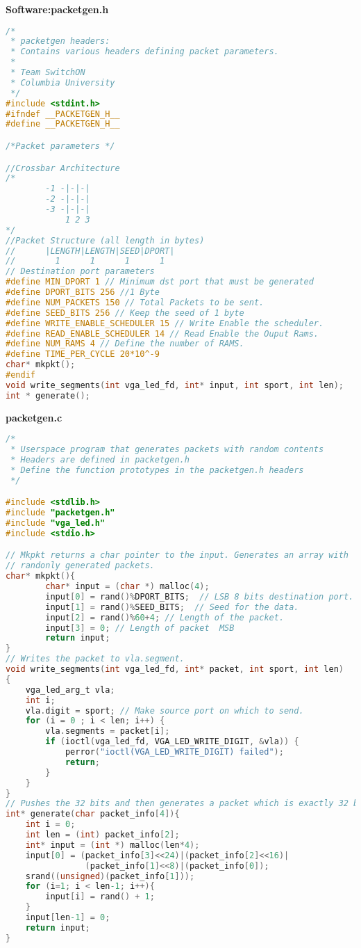 \documentclass[twoside,12pt,fleqn]{book} %
\begin{document}
\textbf{Software:packetgen.h}
\begin{lstlisting}[language=C]
/*
 * packetgen headers: 
 * Contains various headers defining packet parameters.  
 * 
 * Team SwitchON
 * Columbia University
 */
#include <stdint.h>
#ifndef __PACKETGEN_H__
#define __PACKETGEN_H__

/*Packet parameters */

//Crossbar Architecture
/*
        -1 -|-|-|
        -2 -|-|-|
        -3 -|-|-|
            1 2 3
*/
//Packet Structure (all length in bytes)
//      |LENGTH|LENGTH|SEED|DPORT|
//        1      1      1      1
// Destination port parameters
#define MIN_DPORT 1 // Minimum dst port that must be generated
#define DPORT_BITS 256 //1 Byte
#define NUM_PACKETS 150 // Total Packets to be sent.
#define SEED_BITS 256 // Keep the seed of 1 byte
#define WRITE_ENABLE_SCHEDULER 15 // Write Enable the scheduler.
#define READ_ENABLE_SCHEDULER 14 // Read Enable the Ouput Rams. 
#define NUM_RAMS 4 // Define the number of RAMS.
#define TIME_PER_CYCLE 20*10^-9
char* mkpkt();
#endif
void write_segments(int vga_led_fd, int* input, int sport, int len);
int * generate();
\end{lstlisting}
\newpage
\textbf{packetgen.c}
\begin{lstlisting}[language=C]
/*
 * Userspace program that generates packets with random contents 
 * Headers are defined in packetgen.h 
 * Define the function prototypes in the packetgen.h headers
 */

#include <stdlib.h>
#include "packetgen.h"
#include "vga_led.h"
#include <stdio.h>

// Mkpkt returns a char pointer to the input. Generates an array with 
// randonly generated packets.
char* mkpkt(){
        char* input = (char *) malloc(4);
        input[0] = rand()%DPORT_BITS;  // LSB 8 bits destination port.
        input[1] = rand()%SEED_BITS;  // Seed for the data. 
        input[2] = rand()%60+4; // Length of the packet.
        input[3] = 0; // Length of packet  MSB
        return input;
}
// Writes the packet to vla.segment.
void write_segments(int vga_led_fd, int* packet, int sport, int len)
{
    vga_led_arg_t vla;
    int i;
    vla.digit = sport; // Make source port on which to send.
    for (i = 0 ; i < len; i++) {
        vla.segments = packet[i];
        if (ioctl(vga_led_fd, VGA_LED_WRITE_DIGIT, &vla)) {
            perror("ioctl(VGA_LED_WRITE_DIGIT) failed");
            return;
        }
    }
}
// Pushes the 32 bits and then generates a packet which is exactly 32 bytes.
int* generate(char packet_info[4]){
    int i = 0;
    int len = (int) packet_info[2];
    int* input = (int *) malloc(len*4);
    input[0] = (packet_info[3]<<24)|(packet_info[2]<<16)|
                (packet_info[1]<<8)|(packet_info[0]);
    srand((unsigned)(packet_info[1]));
    for (i=1; i < len-1; i++){
        input[i] = rand() + 1;
    }
    input[len-1] = 0;
    return input;
}
\end{lstlisting}
\end{document}
